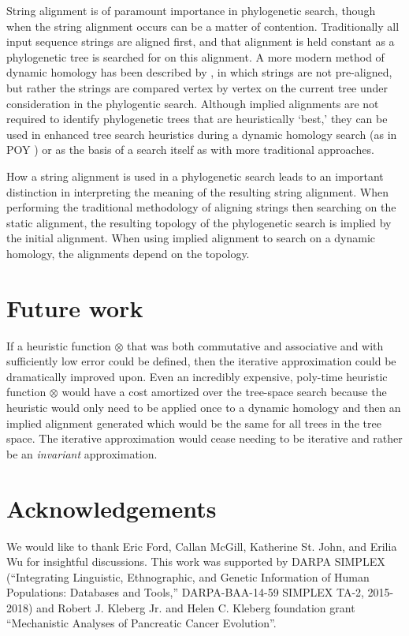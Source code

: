 \documentclass[11pt]{article}
\begin{document}
String alignment is of paramount importance in phylogenetic search, though when the string alignment occurs can be a matter of contention.
Traditionally all input sequence strings are aligned first, and that alignment is held constant as a phylogenetic tree is searched for on this alignment.
A more modern method of dynamic homology has been described by \citep{Wheeler1996}, in which strings are not pre-aligned, but rather the strings are compared vertex by vertex on the current tree under consideration in the phylogentic search.
Although implied alignments are not required to identify phylogenetic trees that are heuristically `best,' they can be used in enhanced tree search heuristics during a dynamic homology search (as in POY \citealp{POY5, Wheeleretal2015}) or as the basis of a search itself as with more traditional approaches.

How a string alignment is used in a phylogenetic search leads to an important distinction in interpreting the meaning of the resulting string alignment.
When performing the traditional methodology of aligning strings then searching on the static alignment, the resulting topology of the phylogenetic search is implied by the initial alignment.
When using implied alignment to search on a dynamic homology, the alignments depend on the topology.


\section{Future work}
If a heuristic function $\otimes$ that was both commutative and associative and with sufficiently low error could be defined, then the iterative approximation \citep{Wheeler2003a} could be dramatically improved upon. 
Even an incredibly expensive, poly-time heuristic function $\otimes$ would have a cost amortized over the tree-space search because the heuristic would only need to be applied once to a dynamic homology and then an implied alignment generated which would be the same for all trees in the tree space. 
The iterative approximation would cease needing to be iterative and rather be an \emph{invariant} approximation.

\section{Acknowledgements}
We would like to thank Eric Ford, Callan McGill, Katherine St. John, and Erilia Wu for insightful discussions. This work was supported by DARPA SIMPLEX (``Integrating Linguistic, Ethnographic, and Genetic Information of Human Populations: Databases and Tools,'' DARPA-BAA-14-59 SIMPLEX TA-2, 2015-2018)
 and Robert J. Kleberg Jr. and Helen C. Kleberg foundation grant ``Mechanistic Analyses of Pancreatic Cancer Evolution''.
\end{document}
